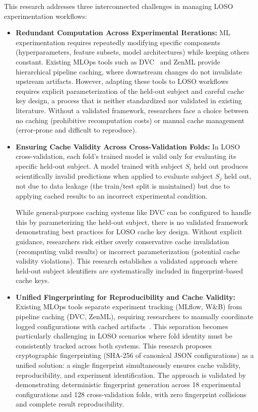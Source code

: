 \documentclass{imc-inf} %
\begin{document}
This research addresses three interconnected challenges in managing LOSO experimentation workflows:

\begin{itemize}

\item \textbf{Redundant Computation Across Experimental Iterations:} 
ML experimentation requires repeatedly modifying specific components 
(hyperparameters, feature subsets, model architectures) while keeping others 
constant. Existing MLOps tools such as DVC~\cite{dvc2022inproceedings} and 
ZenML provide hierarchical pipeline caching, where downstream changes do not 
invalidate upstream artifacts. However, adapting these tools to LOSO workflows 
requires explicit parameterization of the held-out subject and careful cache 
key design, a process that is neither standardized nor validated in existing 
literature. Without a validated framework, researchers face a choice between 
no caching (prohibitive recomputation costs) or manual cache management 
(error-prone and difficult to reproduce).


\item \textbf{Ensuring Cache Validity Across Cross-Validation Folds:}
In LOSO cross-validation, each fold's trained model is valid only for 
evaluating its specific held-out subject. A model trained with subject $S_i$ 
held out produces scientifically invalid predictions when applied to evaluate 
subject $S_j$ held out, not due to data leakage (the train/test split is 
maintained) but due to applying cached results to an incorrect experimental 
condition.

While general-purpose caching systems like DVC can be configured to handle this 
by parameterizing the held-out subject, there is no validated framework 
demonstrating best practices for LOSO cache key design. Without explicit 
guidance, researchers risk either overly conservative cache invalidation 
(recomputing valid results) or incorrect parameterization (potential cache 
validity violations). This research establishes a validated approach where 
held-out subject identifiers are systematically included in fingerprint-based 
cache keys.



\item \textbf{Unified Fingerprinting for Reproducibility and Cache Validity:}
Existing MLOps tools separate experiment tracking (MLflow, W\&B) from 
pipeline caching (DVC, ZenML), requiring researchers to manually coordinate 
logged configurations with cached artifacts~\cite{zaharia2018mlflow,%
wandb2024docs,dvc2022inproceedings}. This separation becomes particularly 
challenging in LOSO scenarios where fold identity must be consistently tracked 
across both systems. This research proposes cryptographic fingerprinting 
(SHA-256 of canonical JSON configurations) as a unified solution: a single 
fingerprint simultaneously ensures cache validity, reproducibility, and 
experiment identification. The approach is validated by demonstrating 
deterministic fingerprint generation across 18 experimental configurations 
and 128 cross-validation folds, with zero fingerprint collisions and 
complete result reproducibility.

\end{itemize}
\end{document}
